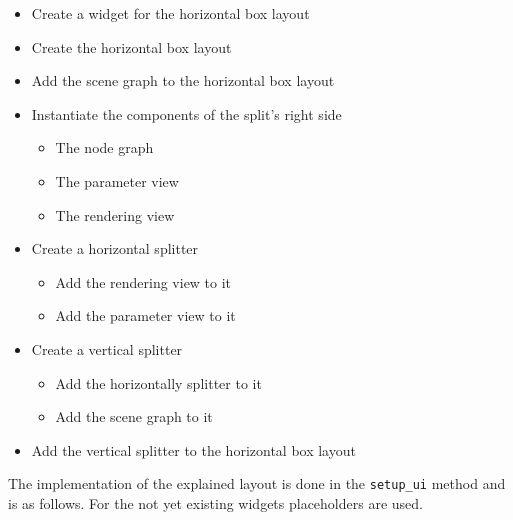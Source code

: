 \documentclass[10pt, openright, notitlepage]{scrreprt}
\begin{document}
\begin{itemize}
\item Create a widget for the horizontal box layout
\item Create the horizontal box layout
\item Add the scene graph to the horizontal box layout
\item Instantiate the components of the split's right side
\begin{itemize}
\item The node graph
\item The parameter view
\item The rendering view
\end{itemize}
\item Create a horizontal splitter
\begin{itemize}
\item Add the rendering view to it
\item Add the parameter view to it
\end{itemize}
\item Create a vertical splitter
\begin{itemize}
\item Add the horizontally splitter to it
\item Add the scene graph to it
\end{itemize}
\item Add the vertical splitter to the horizontal box layout
\end{itemize}

The implementation of the explained layout is done in the \texttt{setup\_ui} method and
is as follows. For the not yet existing widgets placeholders are used.
\end{document}
